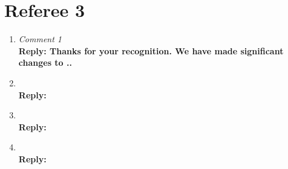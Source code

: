 \section{Referee 3}
\begin{enumerate}
\item \emph{  Comment 1} \\
\textbf{Reply: Thanks for your recognition. We have made significant changes to ..}

\item \emph{  } \\
\textbf{Reply: }

\item \emph{  } \\
\textbf{Reply:}

\item \emph{ } \\
\textbf{Reply: }

\end{enumerate}


%
%

